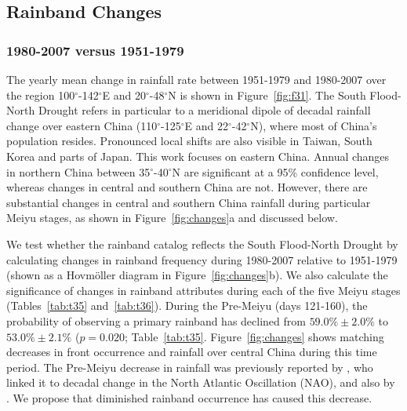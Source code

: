 \documentclass{ametsoc}
\begin{document}
\subsection{Rainband Changes}

\subsubsection{1980-2007 versus 1951-1979}

	The yearly mean change in rainfall rate between 1951-1979 and 1980-2007 over the region 100$^{\circ}$-142$^{\circ}$E and 20$^{\circ}$-48$^{\circ}$N is shown in Figure~\ref{fig:f31}. The South Flood-North Drought refers in particular to a meridional dipole of decadal rainfall change over eastern China (110$^{\circ}$-125$^{\circ}$E and 22$^{\circ}$-42$^{\circ}$N), where most of China's population resides. Pronounced local shifts are also visible in Taiwan, South Korea and parts of Japan. This work focuses on eastern China. Annual changes in northern China between 35$^{\circ}$-40$^{\circ}$N are significant at a 95\% confidence level, whereas changes in central and southern China are not. However, there are substantial changes in central and southern China rainfall during particular Meiyu stages, as shown in Figure~\ref{fig:changes}a and discussed below.
		
	We test whether the rainband catalog reflects the South Flood-North Drought by calculating changes in rainband frequency during 1980-2007 relative to 1951-1979 (shown as a Hovm\"oller diagram in Figure~\ref{fig:changes}b). We also calculate the significance of changes in rainband attributes during each of the five Meiyu stages (Tables~\ref{tab:t35} and~\ref{tab:t36}). During the Pre-Meiyu (days 121-160), the probability of observing a primary rainband has declined from $59.0\% \pm 2.0\%$ to $53.0\% \pm 2.1\%$ ($p=0.020$; Table~\ref{tab:t35}. Figure~\ref{fig:changes} shows matching decreases in front occurrence and rainfall over central China during this time period. The Pre-Meiyu decrease in rainfall was previously reported by \citet{Xin2006}, who linked it to decadal change in the North Atlantic Oscillation (NAO), and also by \citet{Wang2009}. We propose that diminished rainband occurrence has caused this decrease.
		
\end{document}
